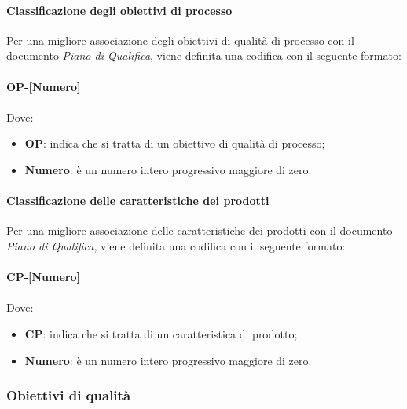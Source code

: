 \paragraph{Classificazione degli obiettivi di processo}
Per una migliore associazione degli obiettivi di qualità di processo con il documento \textit{Piano di Qualifica}, viene definita una codifica con il seguente formato: \\
\\ \textbf{OP-[Numero]} \\
\\ Dove:
\begin{itemize}
	\item \textbf{OP}: indica che si tratta di un obiettivo di qualità di processo;
	\item \textbf{Numero}: è un numero intero progressivo maggiore di zero.
\end{itemize}

\paragraph{Classificazione delle caratteristiche dei prodotti}
Per una migliore associazione delle caratteristiche dei prodotti con il documento \textit{Piano di Qualifica}, viene definita una codifica con il seguente formato: \\
\\ \textbf{CP-[Numero]} \\
\\ Dove:
\begin{itemize}
	\item \textbf{CP}: indica che si tratta di un caratteristica di prodotto;
	\item \textbf{Numero}: è un numero intero progressivo maggiore di zero.
\end{itemize}

\subsubsection{Obiettivi di qualità}
